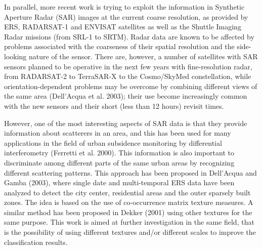 \documentclass[paper=a4, fontsize=11pt]{scrartcl}
\begin{document}
In parallel, more recent work is trying to exploit the information in Synthetic Aperture Radar (SAR) images at the current coarse resolution, as provided by ERS, RADARSAT-1 and ENVISAT satellites as well as the Shuttle Imaging Radar missions (from SRL-1 to SRTM). 
Radar data are known to be affected by problems associated with the coarseness of their spatial resolution and the side-looking nature of the sensor. 
There are, however, a number of satellites with SAR sensors planned to be operative in the next few years with fine-resolution radar, from RADARSAT-2 to TerraSAR-X to the Cosmo/SkyMed constellation, while orientation-dependent problems may be overcome by combining different views of the same area (Dell’Acqua et al. 2003); their use become increasingly common with the new sensors and their short (less than 12 hours) revisit times.

However, one of the most interesting aspects of SAR data is that they provide information about scatterers in an area, and this has been used for many applications in the field of urban subsidence monitoring by differential interferometry (Ferretti et al. 2000). 
This information is also important to discriminate among different parts of the same urban areas by recognizing different scattering patterns. 
This approach has been proposed in Dell’Acqua and Gamba (2003), where single date and multi-temporal ERS data have been analyzed to detect the city center, residential areas and the outer sparsely built zones. 
The idea is based on the use of co-occurrence matrix texture measures. 
A similar method has been proposed in Dekker (2001) using other textures for the same purpose. 
This work is aimed at further investigation in the same field, that is the possibility of using different textures and/or different scales to improve the classification results.
\end{document}
